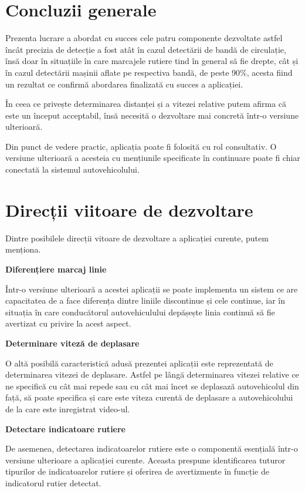\section*{Concluzii generale}
Prezenta lucrare a abordat cu succes cele patru componente dezvoltate astfel încât precizia de detecție a fost atât în cazul detectării de bandă de circulație, însă doar în situațiile în care marcajele rutiere tind în general să fie drepte, cât și în cazul detectării mașinii aflate pe respectiva bandă, de peste 90\%, acesta fiind un rezultat ce confirmă abordarea finalizată cu succes a aplicației.  

În ceea ce privește determinarea distanței și a vitezei relative putem afirma că este un început acceptabil, însă necesită o dezvoltare mai concretă într-o versiune ulterioară.

Din punct de vedere practic, aplicația poate fi folosită cu rol consultativ. O versiune ulterioară a acesteia cu mențiunile specificate în continuare poate fi chiar conectată la sistemul autovehicolului.

\section*{Direcții viitoare de dezvoltare}
Dintre posibilele direcții vitoare de dezvoltare a aplicației curente, putem menționa.

\textbf{Diferențiere marcaj linie}

Într-o versiune ulterioară a acestei aplicații se poate implementa un sistem ce are capacitatea de a face diferența dintre liniile discontinue și cele continue, iar în situația în care conducătorul autovehiculului depășește linia continuă să fie avertizat cu privire la acest aspect.

\textbf{Determinare viteză de deplasare}

O altă posibilă caracteristică adusă prezentei aplicații este reprezentată de determinarea vitezei de deplasare. Astfel pe lângă determinarea vitezei relative ce ne specifică cu cât mai repede sau cu cât mai încet se deplasază autovehicolul din față, să poate specifica și care este viteza curentă de deplasare a autovehicolului de la care este inregistrat video-ul.

\textbf{Detectare indicatoare rutiere}

De asemenea, detectarea indicatoarelor rutiere este o componentă esențială într-o versiune ulterioare a aplicației curente. Aceasta prespune identificarea tuturor tipurilor de indicatoarelor rutiere și oferirea de avertizmente în funcție de indicatorul rutier detectat.

